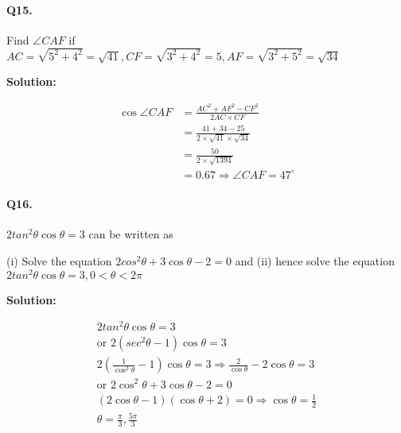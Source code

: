 \documentclass{article}
\begin{document}
\paragraph{Q15.}
Find $\angle CAF$ if $AC = \sqrt{5^{2}+4^{2}} = \sqrt{41}, CF = \sqrt{3^{2}+4^{2}} = 5, AF = \sqrt{3^{2}+5^{2}} = \sqrt{34}$


{\scriptsize \textbf{Solution:}}

\[
  \begin{aligned}
    \cos \angle CAF &= \frac{AC^{2}+AF^{2}-CF^{2}}{2AC \times CF} \\
                    &= \frac{41+34-25}{2\times \sqrt{41} \times \sqrt{34}} \\
                    &= \frac{50}{2 \times \sqrt{1394}} \\
                    &= 0.67 \Rightarrow \angle CAF = 47^{\circ}
  \end{aligned}
\]

\paragraph{Q16.}
$2tan^{2}\theta \cos\theta = 3$ can be written as

(i) Solve the equation $2cos^{2}\theta + 3\cos\theta - 2 = 0$ and (ii) hence solve the equation $2tan^{2}\theta \cos\theta = 3, 0 < \theta < 2\pi$

{\scriptsize \textbf{Solution:}}

\[
  \begin{aligned}
    2tan^{2}\theta \cos\theta = 3 \\
    \text{or } 2(sec^{2}\theta - 1) \cos\theta = 3 \\
    2 \left( \frac{1}{\cos^{2}\theta} - 1 \right) \cos\theta = 3 \Rightarrow \frac{2}{\cos\theta} - 2\cos\theta = 3 \\
    \text{or } 2\cos^{2}\theta + 3\cos\theta - 2 = 0 \\
    (2\cos\theta - 1)(\cos\theta + 2) = 0 \Rightarrow \cos\theta = \frac{1}{2} \\
    \theta = \frac{\pi}{3}, \frac{5\pi}{3}
  \end{aligned}
\]
\end{document}
